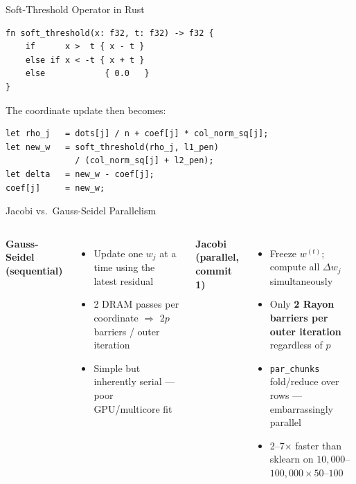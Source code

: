 \documentclass[aspectratio=169]{beamer}
\begin{document}
\begin{frame}[fragile]{Soft-Threshold Operator in Rust}
\begin{lstlisting}
fn soft_threshold(x: f32, t: f32) -> f32 {
    if      x >  t { x - t }
    else if x < -t { x + t }
    else            { 0.0   }
}
\end{lstlisting}
  \vspace{0.6em}
  The coordinate update then becomes:
\begin{lstlisting}
let rho_j   = dots[j] / n + coef[j] * col_norm_sq[j];
let new_w   = soft_threshold(rho_j, l1_pen)
              / (col_norm_sq[j] + l2_pen);
let delta   = new_w - coef[j];
coef[j]     = new_w;
\end{lstlisting}
\end{frame}

\begin{frame}{Jacobi vs.\ Gauss-Seidel Parallelism}
  \begin{columns}
    \textbf{Gauss-Seidel (sequential)}
    \begin{itemize}
      \item Update one $w_j$ at a time using the latest residual
      \item 2 DRAM passes per coordinate $\Rightarrow$ $2p$ barriers / outer iteration
      \item Simple but inherently serial — poor GPU/multicore fit
    \end{itemize}
    \textbf{Jacobi (parallel, commit 1)}
    \begin{itemize}
      \item Freeze $w^{(t)}$; compute all $\Delta w_j$ simultaneously
      \item Only \textbf{2 Rayon barriers per outer iteration} regardless of $p$
      \item \texttt{par\_chunks} fold/reduce over rows — embarrassingly parallel
      \item 2--7$\times$ faster than sklearn on $10{,}000$--$100{,}000 \times 50$--$100$
    \end{itemize}
  \end{columns}
\end{frame}
\end{document}
